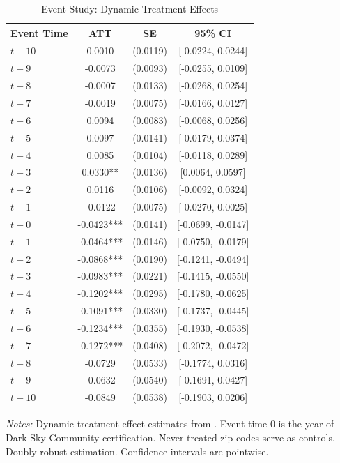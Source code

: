 
\begin{table}[H]
\centering
\caption{Event Study: Dynamic Treatment Effects}
\label{tab:event_study}
\begin{threeparttable}
\begin{tabular}{lccc}
\toprule
Event Time & ATT & SE & 95\% CI \\
\midrule
  $t-10$ & 0.0010 & (0.0119) & [-0.0224, 0.0244] \\
  $t-9$ & -0.0073 & (0.0093) & [-0.0255, 0.0109] \\
  $t-8$ & -0.0007 & (0.0133) & [-0.0268, 0.0254] \\
  $t-7$ & -0.0019 & (0.0075) & [-0.0166, 0.0127] \\
  $t-6$ & 0.0094 & (0.0083) & [-0.0068, 0.0256] \\
  $t-5$ & 0.0097 & (0.0141) & [-0.0179, 0.0374] \\
  $t-4$ & 0.0085 & (0.0104) & [-0.0118, 0.0289] \\
  $t-3$ & 0.0330** & (0.0136) & [0.0064, 0.0597] \\
  $t-2$ & 0.0116 & (0.0106) & [-0.0092, 0.0324] \\
  $t-1$ & -0.0122 & (0.0075) & [-0.0270, 0.0025] \\
  $t+0$ & -0.0423*** & (0.0141) & [-0.0699, -0.0147] \\
  $t+1$ & -0.0464*** & (0.0146) & [-0.0750, -0.0179] \\
  $t+2$ & -0.0868*** & (0.0190) & [-0.1241, -0.0494] \\
  $t+3$ & -0.0983*** & (0.0221) & [-0.1415, -0.0550] \\
  $t+4$ & -0.1202*** & (0.0295) & [-0.1780, -0.0625] \\
  $t+5$ & -0.1091*** & (0.0330) & [-0.1737, -0.0445] \\
  $t+6$ & -0.1234*** & (0.0355) & [-0.1930, -0.0538] \\
  $t+7$ & -0.1272*** & (0.0408) & [-0.2072, -0.0472] \\
  $t+8$ & -0.0729 & (0.0533) & [-0.1774, 0.0316] \\
  $t+9$ & -0.0632 & (0.0540) & [-0.1691, 0.0427] \\
  $t+10$ & -0.0849 & (0.0538) & [-0.1903, 0.0206] \\
\bottomrule
\end{tabular}
\begin{tablenotes}[flushleft]
\small
\item \textit{Notes:} Dynamic treatment effect estimates from \citet{callaway2021difference}. Event time 0 is the year of Dark Sky Community certification. Never-treated zip codes serve as controls. Doubly robust estimation. Confidence intervals are pointwise.
\end{tablenotes}
\end{threeparttable}
\end{table}
